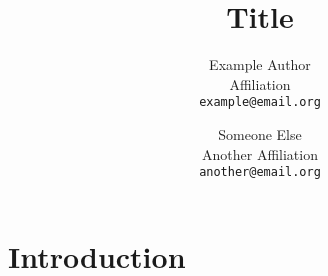 \documentclass[a4paper,11pt]{article}
\title{Title}
\date{}
\author{Example Author\\
	Affiliation\\
	\texttt{example@email.org}
	\and Someone Else\\
	Another Affiliation\\
	\texttt{another@email.org}
}
\begin{document}
\maketitle
\thispagestyle{empty}
\pagestyle{empty}

%
\section{Introduction}
%
%
%
%
%
\end{document}
